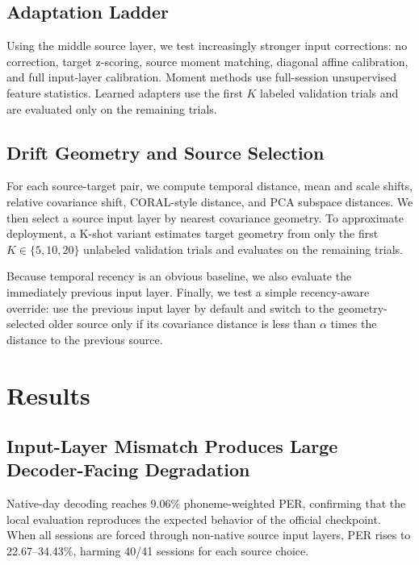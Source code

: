 \documentclass[10pt]{article}
\begin{document}
\subsection{Adaptation Ladder}
Using the middle source layer, we test increasingly stronger input corrections:
no correction, target z-scoring, source moment matching, diagonal affine
calibration, and full input-layer calibration. Moment methods use full-session
unsupervised feature statistics. Learned adapters use the first $K$ labeled
validation trials and are evaluated only on the remaining trials.

\subsection{Drift Geometry and Source Selection}
For each source-target pair, we compute temporal distance, mean and scale shifts,
relative covariance shift, CORAL-style distance, and PCA subspace distances. We
then select a source input layer by nearest covariance geometry. To approximate
deployment, a K-shot variant estimates target geometry from only the first
$K \in \{5,10,20\}$ unlabeled validation trials and evaluates on the remaining
trials.

Because temporal recency is an obvious baseline, we also evaluate the immediately
previous input layer. Finally, we test a simple recency-aware override: use the
previous input layer by default and switch to the geometry-selected older source
only if its covariance distance is less than $\alpha$ times the distance to the
previous source.

\section{Results}
\subsection{Input-Layer Mismatch Produces Large Decoder-Facing Degradation}
Native-day decoding reaches 9.06\% phoneme-weighted PER, confirming that the
local evaluation reproduces the expected behavior of the official checkpoint.
When all sessions are forced through non-native source input layers, PER rises to
22.67--34.43\%, harming 40/41 sessions for each source choice.
\end{document}
